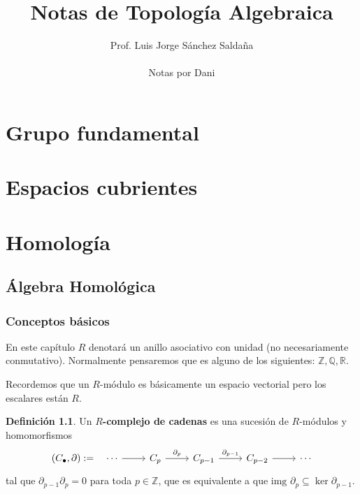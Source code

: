 \documentclass{book}
\title{Notas de Topología Algebraica}
\author{Prof. Luis Jorge Sánchez Saldaña\\ \\ Notas por Dani}
\theoremstyle{definition}
\newtheorem*{defn}{Definición}
\newcommand{\R}{\mathbb{R}}
\newcommand{\Z}{\mathbb{Z}}
\newcommand{\Q}{\mathbb{Q}}
\begin{document}
	\maketitle
	\tableofcontents
	
	\part{Grupo fundamental}
	
	\part{Espacios cubrientes}
	
	\part{Homología}
	\chapter{Álgebra Homológica}
	\section{Conceptos básicos}
	En este capítulo $R$ denotará un anillo asociativo con unidad (no necesariamente conmutativo). Normalmente pensaremos que es alguno de los siguientes: $\Z, \Q, \R$.
	
	Recordemos que un $R$-módulo es básicamente un espacio vectorial pero los escalares están $R$.
	\begin{defn}
		Un \textbf{$R$-complejo de cadenas} es una sucesión de $R$-módulos y homomorfismos
		\[\begin{tikzcd}
			(C_\bullet,\partial):= \quad \cdots \arrow{r} & C_p \arrow{r}{\partial_p} & C_{p-1} \arrow{r}{\partial_{p-1}} & C_{p-2} \arrow{r} & \cdots
		\end{tikzcd}\]
		tal que $\partial_{p-1}\partial_p=0$ para toda $p\in \mathbb{Z}$, que es equivalente a que $\text{img }\partial_p\subseteq\ker{\partial_{p-1}}$.
	\end{defn}
	
\end{document}

